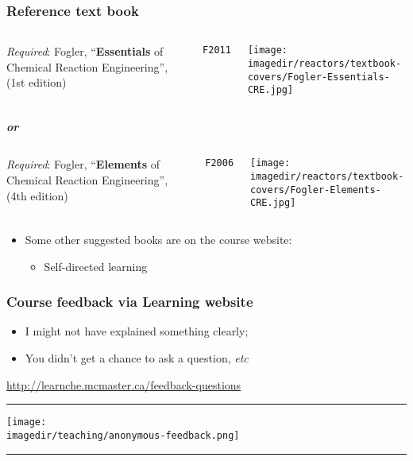 \begin{frame}\frametitle{Reference text book}
	
	\begin{columns}[t]
			\emph{Required}: Fogler, ``\textbf{Essentials} of Chemical Reaction Engineering'', (1st edition)
			
			\vspace{3pt}
			\texttt{F2011}
			\vspace{-1cm}
			\begin{center}
				\texttt{[image: \\imagedir/reactors/textbook-covers/Fogler-Essentials-CRE.jpg]}
			\end{center}
	\end{columns}
	\vspace{0pt}
	\begin{center}
		\emph{\textbf{or}}
	\end{center}
	\vspace{12pt}
	\begin{columns}[t]
			\emph{Required}: Fogler, ``\textbf{Elements} of Chemical Reaction Engineering'', (4th edition)
			
			\vspace{3pt}
			\texttt{F2006}
			\vspace{-1cm}
			\begin{center}
				\texttt{[image: \\imagedir/reactors/textbook-covers/Fogler-Elements-CRE.jpg]}
			\end{center}
	\end{columns}
	
	\begin{itemize}
		\item	Some other suggested books are on the course website: 
		\begin{itemize}
			\item	Self-directed learning
		\end{itemize}
	\end{itemize}
\end{frame}

\begin{frame}\frametitle{Course feedback via Learning website}
	\begin{itemize}
		\item	I might not have explained something clearly; 
		\item	You didn't get a chance to ask a question, \emph{etc}
	\end{itemize}
	\href{http://learnche.mcmaster.ca/feedback-questions}{http://learnche.mcmaster.ca/feedback-questions}
	\vspace{12pt}
	\hrule
	\begin{center}
		\texttt{[image: \\imagedir/teaching/anonymous-feedback.png]}
	\end{center}
	\hrule
\end{frame}

